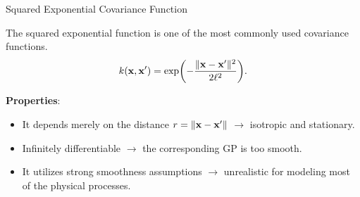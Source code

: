 \begin{frame}[c]{Squared Exponential Covariance Function}

The squared exponential function is one of the most commonly used covariance functions.
$$
k(\mathbf{x}, \mathbf{x}^\prime) = \exp\biggl(- \frac{\|\mathbf{x} - \mathbf{x}^\prime\|^2}{2\ell^2}\biggr).
$$

\textbf{Properties}:
\begin{itemize}
\item[\faLightbulbO] It depends merely on the distance $r = \|\mathbf{x} - \mathbf{x}^\prime\|$ $\to$ isotropic and stationary.\lz
\item[\faLightbulbO] Infinitely differentiable $\to$ the corresponding GP is too smooth.\lz
\item[\faLightbulbO] It utilizes strong smoothness assumptions $\to$ unrealistic for modeling most of the physical processes.

\end{itemize}

\end{frame}

